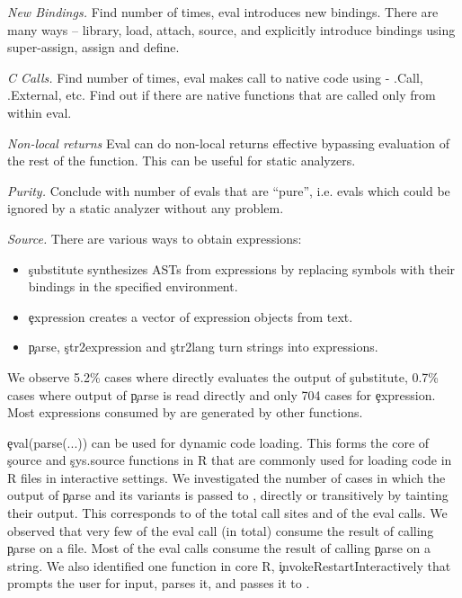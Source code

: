 \documentclass[USenglish,cleveref, autoref, thm-restate]{lipics-v2019}
\newcommand{\mypara}[1]{\medskip\noindent\emph{#1}\xspace}
\begin{document}
\mypara{New Bindings.} Find number of times, eval introduces new
bindings. There are many ways -- library, load, attach, source, and
explicitly introduce bindings using super-assign, assign and define.

\mypara{C Calls.} Find number of times, eval makes call to native code
using - .Call, .External, etc. Find out if there are native functions
that are called only from within eval.

\mypara{Non-local returns}
Eval can do non-local returns effective bypassing evaluation of the
rest of the function. This can be useful for static analyzers.

\mypara{Purity.}
Conclude with number of evals that are ``pure'', i.e. evals which
could be ignored by a static analyzer without any problem.

\mypara{Source.}
There are various ways to obtain expressions:
\begin{itemize}
  \item \c{substitute} synthesizes ASTs from expressions by replacing
    symbols with their bindings in the specified environment.
  \item \c{expression}  creates a vector of expression
    objects from text.
  \item \c{parse}, \c{str2expression} and \c{str2lang} turn strings into
    expressions.
\end{itemize}

We observe 5.2\% cases where \eval directly evaluates the output of
\c{substitute}, 0.7\% cases where output of \c{parse} is read directly
and only 704 cases for \c{expression}. Most expressions consumed by
\eval are generated by other functions.

\c{eval(parse(...))} can be used for dynamic code loading. This forms
the core of \c{source} and \c{sys.source} functions in R that are
commonly used for loading code in R files in interactive settings. We
investigated the number of cases in which the output of \c{parse} and
its variants is passed to \eval, directly or transitively by tainting
their output. This corresponds to \PercentParsedCallSites of the total
\eval call sites and \PercentParsedEvals of the eval calls. We
observed that very few of the eval call (\NbParseFilesRnd in total)
consume the result of calling \c{parse} on a file. Most of the eval
calls consume the result of calling \c{parse} on a string. We also
identified one function in core R, \c{invokeRestartInteractively} that
prompts the user for input, parses it, and passes it to \eval.
\end{document}
